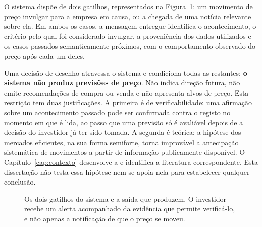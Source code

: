 O sistema dispõe de dois gatilhos, representados na Figura~\ref{fig:conceito}: um movimento de
preço invulgar para a empresa em causa, ou a chegada de uma notícia relevante sobre ela. Em ambos
os casos, a mensagem entregue identifica o acontecimento, o critério pelo qual foi considerado
invulgar, a proveniência dos dados utilizados e os casos passados semanticamente próximos, com o
comportamento observado do preço após cada um deles.

Uma decisão de desenho atravessa o sistema e condiciona todas as restantes: \textbf{o sistema não
produz previsões de preço}. Não indica direção futura, não emite recomendações de compra ou venda
e não apresenta alvos de preço. Esta restrição tem duas justificações. A primeira é de
verificabilidade: uma afirmação sobre um acontecimento passado pode ser confirmada contra o
registo no momento em que é lida, ao passo que uma previsão só é avaliável depois de a decisão do
investidor já ter sido tomada. A segunda é teórica: a hipótese dos mercados eficientes, na
sua forma semiforte, torna improvável a antecipação sistemática de movimentos a partir de
informação publicamente disponível. O Capítulo~\ref{cap:contexto} desenvolve-a e identifica a
literatura correspondente. Esta dissertação não testa essa hipótese nem se apoia nela para
estabelecer qualquer conclusão.

\begin{figure}[ht]
\centering
{}
\caption[Os dois gatilhos do sistema]{Os dois gatilhos do sistema e a saída que produzem. O
investidor recebe um alerta acompanhado da evidência que permite verificá-lo, e não apenas a
notificação de que o preço se moveu.}
\label{fig:conceito}
\end{figure}

